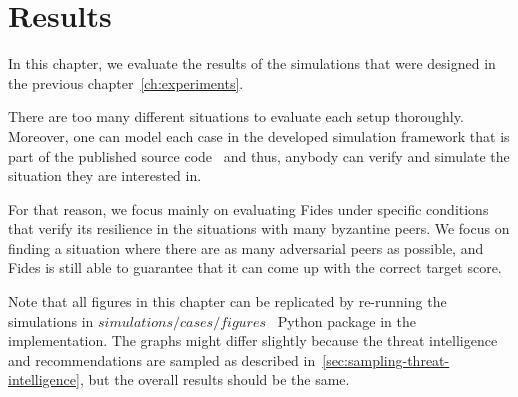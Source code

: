 \chapter{Results}
\label{ch:results}

In this chapter, we evaluate the results of the simulations that were designed in the previous chapter~\ref{ch:experiments}.

There are too many different situations to evaluate each setup thoroughly. Moreover, one can model each case in the developed simulation framework that is part of the published source code~\cite{fidesGithub} and thus, anybody can verify and simulate the situation they are interested in.

For that reason, we focus mainly on evaluating Fides under specific conditions that verify its resilience in the situations with many byzantine peers.
We focus on finding a situation where there are as many adversarial peers as possible, and Fides is still able to guarantee that it can come up with the correct target score.

Note that all figures in this chapter can be replicated by re-running the simulations in $simulations/cases/figures$~\cite{fidesGithub} Python package in the implementation.
The graphs might differ slightly because the threat intelligence and recommendations are sampled as described in~\ref{sec:sampling-threat-intelligence}, but the overall results should be the same.





